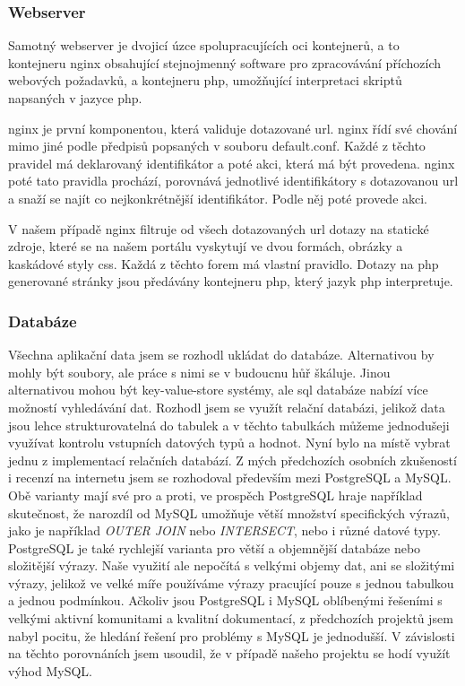 \subsubsection{Webserver}
Samotný webserver je dvojicí úzce spolupracujících \acrshort{oci} kontejnerů, a to kontejneru \acrshort{nginx} obsahující stejnojmenný software pro zpracovávání příchozích webových požadavků, a kontejneru \acrshort{php}, umožňující interpretaci skriptů napsaných v jazyce \acrshort{php}.

\acrshort{nginx} je první komponentou, která validuje dotazované \acrshort{url}. \acrshort{nginx} řídí své chování mimo jiné podle předpisů popsaných v souboru default.conf. Každé z těchto pravidel má deklarovaný identifikátor a poté akci, která má být provedena. \acrshort{nginx} poté tato pravidla prochází, porovnává jednotlivé identifikátory s dotazovanou \acrshort{url} a snaží se najít co nejkonkrétnější identifikátor. Podle něj poté provede akci.

V našem případě \acrshort{nginx} filtruje od všech dotazovaných \acrshort{url} dotazy na statické zdroje, které se na našem portálu vyskytují ve dvou formách, obrázky a kaskádové styly \acrshort{css}. Každá z těchto forem má vlastní pravidlo. Dotazy na \acrshort{php} generované stránky jsou předávány kontejneru \acrshort{php}, který jazyk \acrshort{php} interpretuje.

\subsubsection{Databáze}
Všechna aplikační data jsem se rozhodl ukládat do databáze. Alternativou by mohly být soubory, ale práce s nimi se v budoucnu hůř škáluje. Jinou alternativou mohou být key-value-store systémy, ale \acrshort{sql} databáze nabízí více možností vyhledávání dat. Rozhodl jsem se využít relační databázi, jelikož data jsou lehce strukturovatelná do tabulek a v těchto tabulkách můžeme jednodušeji využívat kontrolu vstupních datových typů a hodnot. Nyní bylo na místě vybrat jednu z implementací relačních databází. Z mých předchozích osobních zkušeností i recenzí na internetu jsem se rozhodoval především mezi PostgreSQL a MySQL. Obě varianty mají své pro a proti, ve prospěch PostgreSQL hraje například skutečnost, že narozdíl od MySQL umožňuje větší množství specifických výrazů, jako je například \emph{OUTER JOIN} nebo \emph{INTERSECT}, nebo i různé datové typy. PostgreSQL je také rychlejší varianta pro větší a objemnější databáze nebo složitější výrazy. Naše využití ale nepočítá s velkými objemy dat, ani se složitými výrazy, jelikož ve velké míře používáme výrazy pracující pouze s jednou tabulkou a jednou podmínkou. Ačkoliv jsou PostgreSQL i MySQL oblíbenými řešeními s velkými aktivní komunitami a kvalitní dokumentací, z předchozích projektů jsem nabyl pocitu, že hledání řešení pro problémy s MySQL je jednodušší. V závislosti na těchto porovnáních jsem usoudil, že v případě našeho projektu se hodí využít výhod MySQL.

